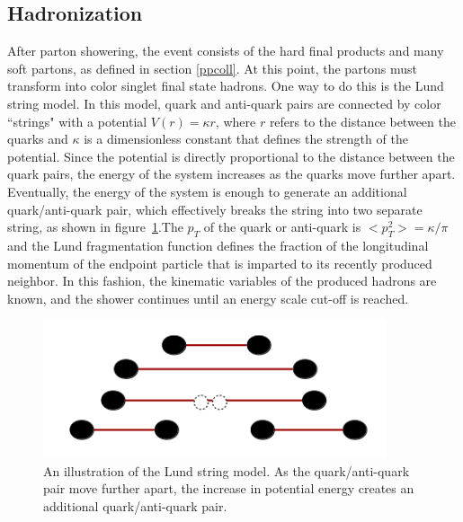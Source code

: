 \documentclass[oneside, letterpaper, oldfontcommands]{memoir}
\begin{document}
\subsection{Hadronization}\label{hadronization}
 
\qquad After parton showering, the event consists of the hard final products and many soft partons, as defined in section \ref{ppcoll}. At this point, the partons must transform into color singlet final state hadrons. One way to do this is the Lund string model\cite{Barger:0201058766}. In this model, quark and anti-quark pairs are connected by color ``strings" with a potential 
$V(r) = \kappa r $, where $r$ refers to the distance between the quarks and $\kappa$ is a dimensionless constant that defines the strength of the potential. Since the potential is directly proportional to the distance between the quark pairs, the energy of the system increases as the quarks move further apart. Eventually, the energy of the system is enough to generate an additional quark/anti-quark pair, which effectively breaks the string into two separate string, as shown in figure~\ref{fig:lund}.The $p_{T}$ of the quark or anti-quark is  
$<p^{2}_{T}> = \kappa / \pi$ and the Lund fragmentation function\cite{Agashe:2014kda} defines the fraction of the longitudinal momentum of the endpoint particle that is imparted to its recently produced neighbor. In this fashion, the kinematic variables of the produced hadrons are known, and the shower continues until an energy scale cut-off is reached.

\begin{figure}[here]
\includegraphics[width=0.9\textwidth]{lundstring.png}
\caption{An illustration of the Lund string model. As the quark/anti-quark pair move further apart, the increase in potential energy creates an additional quark/anti-quark pair.}
\label{fig:lund}
\end{figure}


\end{document}
